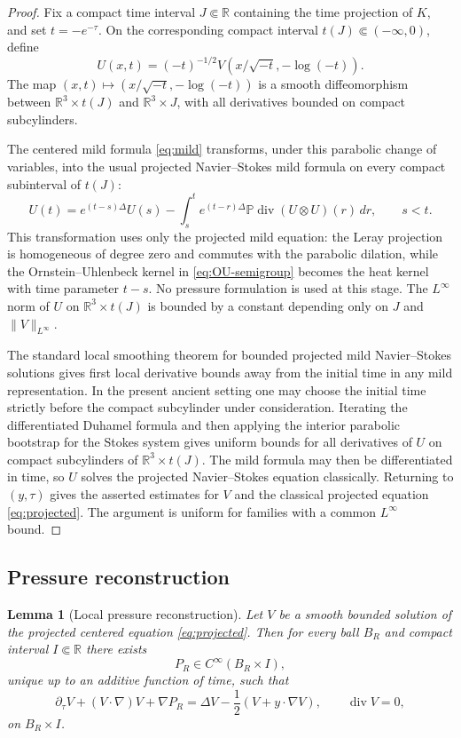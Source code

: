 \documentclass[11pt]{amsart}
\theoremstyle{plain}
\newtheorem{lemma}[theorem]{Lemma}
\theoremstyle{definition}
\theoremstyle{remark}
\numberwithin{equation}{section}
\newcommand{\R}{\mathbb R}
\newcommand{\divergence}{\operatorname{div}}
\begin{document}
\begin{proof}
Fix a compact time interval \(J\Subset\R\) containing the time projection of
\(K\), and set \(t=-e^{-\tau}\).  On the corresponding compact interval
\(t(J)\Subset(-\infty,0)\), define
\[
   U(x,t)=(-t)^{-1/2}V(x/\sqrt{-t},-\log(-t)).
\]
The map \((x,t)\mapsto (x/\sqrt{-t},-\log(-t))\) is a smooth diffeomorphism
between \(\R^3\times t(J)\) and \(\R^3\times J\), with all derivatives bounded
on compact subcylinders.

The centered mild formula \eqref{eq:mild} transforms, under this parabolic
change of variables, into the usual projected Navier--Stokes mild formula on
every compact subinterval of \(t(J)\):
\[
   U(t)=e^{(t-s)\Delta}U(s)
   -
   \int_s^t e^{(t-r)\Delta}\mathbb P\divergence(U\otimes U)(r)\,dr,
   \qquad s<t.
\]
This transformation uses only the projected mild equation: the Leray projection
is homogeneous of degree zero and commutes with the parabolic dilation, while
the Ornstein--Uhlenbeck kernel in \eqref{eq:OU-semigroup} becomes the heat
kernel with time parameter \(t-s\).  No pressure formulation is used at this
stage.  The \(L^\infty\) norm of \(U\) on \(\R^3\times t(J)\) is bounded by a
constant depending only on \(J\) and \(\|V\|_{L^\infty}\).

The standard local smoothing theorem for bounded projected mild
Navier--Stokes solutions \cite{Kato1984,GigaMiyakawa1985} gives first local
derivative bounds away from the initial time in any mild representation.  In
the present ancient setting one may choose the initial time strictly before the
compact subcylinder under consideration.  Iterating the differentiated
Duhamel formula and then applying the interior parabolic bootstrap for the
Stokes system \cite{Ladyzhenskaya1968,Sohr2001} gives uniform bounds for all
derivatives of \(U\) on compact subcylinders of \(\R^3\times t(J)\).  The mild
formula may then be differentiated in time, so \(U\) solves the projected
Navier--Stokes equation classically.  Returning to \((y,\tau)\) gives the
asserted estimates for \(V\) and the classical projected equation
\eqref{eq:projected}.  The argument is uniform for families with a common
\(L^\infty\) bound.
\end{proof}

\subsection{Pressure reconstruction}

\begin{lemma}[Local pressure reconstruction]\label{lem:local-pressure}
Let \(V\) be a smooth bounded solution of the projected centered equation
\eqref{eq:projected}.  Then for every ball \(B_R\) and compact interval
\(I\Subset\R\) there exists
\[
   P_R\in C^\infty(B_R\times I),
\]
unique up to an additive function of time, such that
\[
   \partial_\tau V+(V\cdot\nabla)V+\nabla P_R
   =
   \Delta V-\frac12(V+y\cdot\nabla V),
   \qquad \divergence V=0,
\]
on \(B_R\times I\).
\end{lemma}
\end{document}
